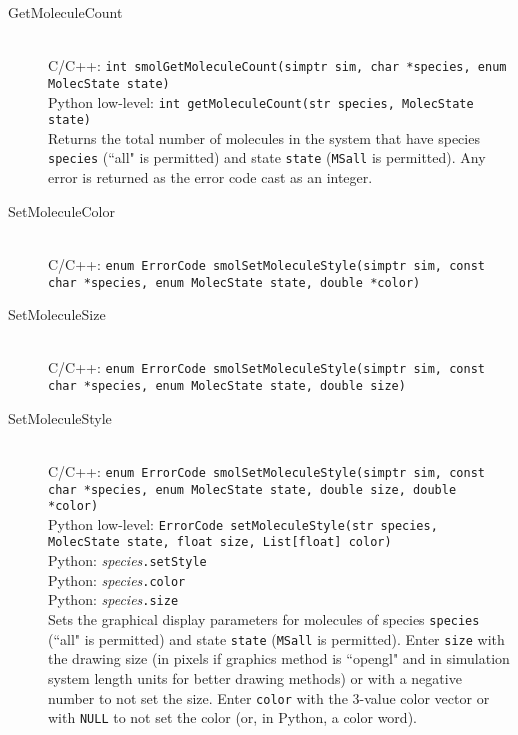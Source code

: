 \documentclass {book}
\newcommand {\ttt} {\texttt}
\begin{document}
\begin{description}
\item[GetMoleculeCount]
\hfill \\
C/C++: \ttt{int smolGetMoleculeCount(simptr sim, char *species, enum MolecState state)}\\
Python low-level: \ttt{int getMoleculeCount(str species, MolecState state)}\\
Returns the total number of molecules in the system that have species \ttt{species} (``all" is permitted) and state \ttt{state} (\ttt{MSall} is permitted). Any error is returned as the error code cast as an integer.

\item[SetMoleculeColor]
\hfill \\
C/C++: \ttt{enum ErrorCode smolSetMoleculeStyle(simptr sim, const char *species, enum MolecState state, double *color)}\\

\item[SetMoleculeSize]
\hfill \\
C/C++: \ttt{enum ErrorCode smolSetMoleculeStyle(simptr sim, const char *species, enum MolecState state, double size)}\\


\item[SetMoleculeStyle]
\hfill \\
C/C++: \ttt{enum ErrorCode smolSetMoleculeStyle(simptr sim, const char *species, enum MolecState state, double size, double *color)}\\
Python low-level: \ttt{ErrorCode setMoleculeStyle(str species, MolecState state, float size, List[float] color)}\\
Python: \textit{species}\ttt{.setStyle}\\
Python: \textit{species}\ttt{.color}\\
Python: \textit{species}\ttt{.size}\\
Sets the graphical display parameters for molecules of species \ttt{species} (``all" is permitted) and state \ttt{state} (\ttt{MSall} is permitted). Enter \ttt{size} with the drawing size (in pixels if graphics method is ``opengl" and in simulation system length units for better drawing methods) or with a negative number to not set the size. Enter \ttt{color} with the 3-value color vector or with \ttt{NULL} to not set the color (or, in Python, a color word).

\end{description}
\end{document}
